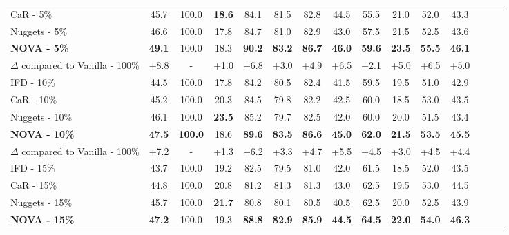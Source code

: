 \begin{table*}
{\begin{tabular}{lcccccccccccccc}
CaR - 5\% &45.7	&100.0 &	\textbf{18.6}	&84.1	&81.5	&82.8 & 44.5 & 55.5 & 21.0 & 52.0 & 43.3 \\
Nuggets - 5\% & 46.6&	100.0 	&17.8	&84.7&	81.0 &	82.9 & 43.0 & 57.5 & 21.5 & 52.5 & 43.6 \\
\rowcolor{blue!5} \textbf{NOVA - 5\%} & \textbf{49.1}	&100.0& 	18.3 &	\textbf{90.2}&	\textbf{83.2}	& \textbf{86.7} & \textbf{46.0} & \textbf{59.6} & \textbf{23.5} & \textbf{55.5} & \textbf{46.1} \\
\hdashline[2pt/3pt]
\rowcolor{blue!5} $\Delta$ compared to Vanilla - 100\% & \textcolor[rgb]{0.7,0,0}{+8.8} &	-	& \textcolor[rgb]{0.7,0,0}{+1.0} 	& \textcolor[rgb]{0.7,0,0}{+6.8} 	& \textcolor[rgb]{0.7,0,0}{+3.0} 	& \textcolor[rgb]{0.7,0,0}{+4.9}  & \textcolor[rgb]{0.7,0,0}{+6.5} & \textcolor[rgb]{0.7,0,0}{+2.1} & \textcolor[rgb]{0.7,0,0}{+5.0} & \textcolor[rgb]{0.7,0,0}{+6.5} & \textcolor[rgb]{0.7,0,0}{+5.0}\\
\midrule
IFD - 10\% & 44.5	& 100.0 &	17.8&	84.2	&80.5&	82.4  & 41.5 & 59.5 & 19.5 & 51.0 & 42.9 \\
CaR - 10\%& 45.2&	100.0 &	20.3&	84.5	&79.8&	82.2  & 42.5 & 60.0 & 18.5 & 53.0 & 43.5 \\
Nuggets - 10\% & 46.1	&100.0& 	\textbf{23.5}&	85.2&	79.7	& 82.5  & 42.0 & 60.0 & 20.0 & 51.5 & 43.4 \\
\rowcolor{blue!5} \textbf{NOVA - 10\%} & \textbf{47.5}	& \textbf{100.0} 	 & 18.6  &	\textbf{89.6}	 & \textbf{83.5} &	\textbf{86.6}  & \textbf{45.0} & \textbf{62.0} & \textbf{21.5} & \textbf{53.5} & \textbf{45.5} \\
\hdashline[2pt/3pt]
\rowcolor{blue!5} $\Delta$ compared to Vanilla - 100\% & \textcolor[rgb]{0.7,0,0}{+7.2} &	-	& \textcolor[rgb]{0.7,0,0}{+1.3} 	& \textcolor[rgb]{0.7,0,0}{+6.2} 	& \textcolor[rgb]{0.7,0,0}{+3.3} 	& \textcolor[rgb]{0.7,0,0}{+4.7} & \textcolor[rgb]{0.7,0,0}{+5.5} & \textcolor[rgb]{0.7,0,0}{+4.5} & \textcolor[rgb]{0.7,0,0}{+3.0} & \textcolor[rgb]{0.7,0,0}{+4.5} & \textcolor[rgb]{0.7,0,0}{+4.4} \\
\midrule
IFD - 15\% & 43.7	 &100.0 &	19.2	&82.5	&79.5	&81.0  & 42.0 & 61.5 & 18.5 & 52.0 & 43.5 \\
CaR - 15\% & 44.8&	100.0 	&20.8&	81.2	&81.3	&81.3 & 43.0 & 62.5 & 19.5 & 53.0 & 44.5\\
Nuggets - 15\% & 45.7&	100.0 &	\textbf{21.7} &	80.8	&80.1	&80.5 & 40.5 & 62.5 & 20.0 & 52.5 & 43.9\\
\rowcolor{blue!5} \textbf{NOVA - 15\%} & \textbf{47.2} &	100.0 	& 19.3 &	\textbf{88.8}	& \textbf{82.9} &	\textbf{85.9} & \textbf{44.5} & \textbf{64.5} & \textbf{22.0} & \textbf{54.0} & \textbf{46.3}  \\

\end{tabular}}
\end{table*}
